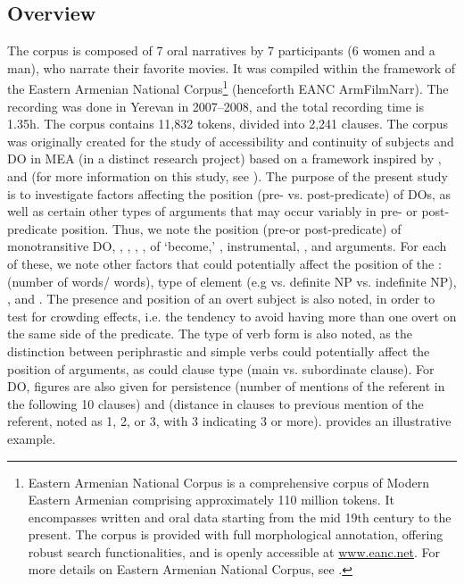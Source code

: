 \documentclass[output=paper,colorlinks,citecolor=brown,draftmode]{langscibook}
\begin{document}
\subsection{Overview}
The corpus is composed of 7 oral narratives by 7 participants (6 women and a man), who narrate their favorite movies. It was compiled within the framework of the Eastern Armenian National Corpus\footnote{Eastern Armenian National Corpus is a comprehensive corpus of Modern Eastern Armenian comprising approximately 110 million tokens. It encompasses written and oral data starting from the mid 19th century to the present. The corpus is provided with full morphological annotation, offering robust search functionalities, and is openly accessible at \url{www.eanc.net}. For more details on Eastern Armenian National Corpus, see \citet{khurshudyan-etal-2022-eastern}.} (henceforth EANC ArmFilmNarr). The recording was done in Yerevan in 2007--2008, and the total recording time is 1.35h. The corpus contains 11,832 tokens, divided into 2,241 clauses. The corpus was originally created for the study of  accessibility and continuity of subjects and DO in MEA (in a distinct research project) based on a framework inspired by \citet{givon_focus_1975}, \citet{givon_topic_1983} and \citet{du_bois_discourse_1987} (for more information on this study, see \citealt{hodgson_word_nodate}).  The purpose of the present study is to investigate factors affecting the position (pre- vs. post-predicate) of DOs, as well as certain other types of arguments that may occur variably in pre- or post-predicate position. Thus, we note the position (pre-or post-predicate) of monotransitive DO, , , , ,  of `become,' , instrumental, , and  arguments. For each of these, we note other factors that could potentially affect the position of the :  (number of words/ words), type of  element (e.g 
vs. definite NP vs. indefinite NP), , and . The presence and position of an overt subject  is also noted, in order to test for crowding effects, i.e. the tendency to avoid having more than one overt  on the same side of the predicate. The type of verb form is also noted, as the distinction between periphrastic and simple verbs could potentially affect the position of arguments, as could clause type (main vs. subordinate clause). For DO, figures are also given for  persistence (number of mentions of the referent in the following 10 clauses) and  (distance in clauses to previous mention of the referent, noted as 1, 2, or 3, with 3 indicating 3 or more).  provides an illustrative example.
\end{document}
